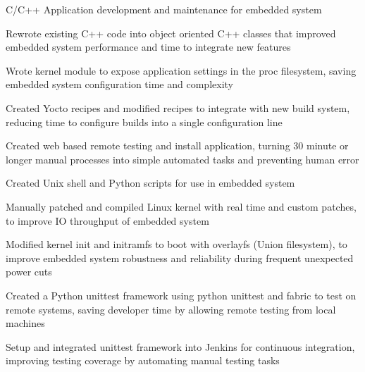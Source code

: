 \documentclass[]{deedy-resume-openfont}
\begin{document}
\begin{minipage}[t]{1.0\textwidth}
\begin{tightemize}
\item C/C++ Application development and maintenance for embedded system
\item Rewrote existing C++ code into object oriented C++ classes that improved embedded system performance and time to integrate new features
\item Wrote kernel module to expose application settings in the proc filesystem, saving embedded system configuration time and complexity
\item Created Yocto recipes and modified recipes to integrate with new build system, reducing time to configure builds into a single configuration line
\item Created web based remote testing and install application, turning 30 minute or longer manual processes into simple automated tasks and preventing human error
\end{tightemize}
\sectionsep

\begin{tightemize}
\item Created Unix shell and Python scripts for use in embedded system
\item Manually patched and compiled Linux kernel with real time and custom patches, to improve IO throughput of embedded system
\item Modified kernel init and initramfs to boot with overlayfs (Union filesystem), to improve embedded system robustness and reliability during frequent unexpected power cuts
\end{tightemize}
\sectionsep

\begin{tightemize}
\item Created a Python unittest framework using python unittest and fabric to test on remote systems, saving developer time by allowing remote testing from local machines
\item Setup and integrated unittest framework into Jenkins for continuous integration, improving testing coverage by automating manual testing tasks
\end{tightemize}
\sectionsep



\end{minipage}
\end{document}
